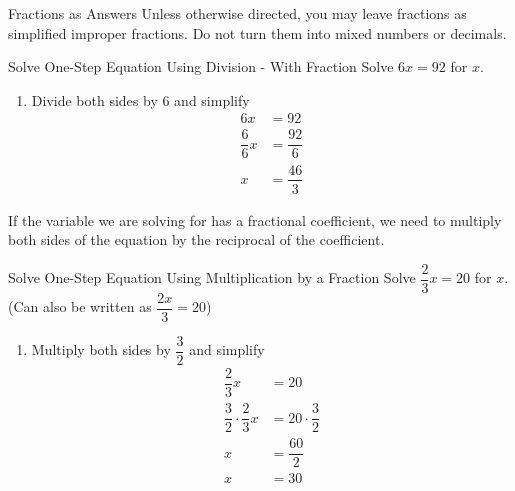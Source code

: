 \begin{note}{Fractions as Answers}{}
    Unless otherwise directed, you may leave fractions as simplified improper fractions. Do not turn them into mixed numbers or decimals.
\end{note}
\begin{example}{Solve One-Step Equation Using Division - With Fraction}{}
    Solve $6x=92$ for $x$.
    \begin{enumerate}
        \item[] Divide both sides by $6$ and simplify
        \begin{align*}        
            6x&=92\\
            \dfrac{6}{6}x&=\dfrac{92}{6}\\
            x&=\dfrac{46}{3}
        \end{align*}        
    \end{enumerate}
\end{example}
If the variable we are solving for has a fractional coefficient, we need to multiply both sides of the equation by the reciprocal of the coefficient.
\begin{example}{Solve One-Step Equation Using Multiplication by a Fraction}{}
    Solve $\dfrac{2}{3}x=20$ for $x$. (Can also be written as $\dfrac{2x}{3}=20$)
    \begin{enumerate}
        \item[] Multiply both sides by $\dfrac{3}{2}$ and simplify
        \begin{align*}        
            \dfrac{2}{3}x&=20\\
            \dfrac{3}{2}\cdot\dfrac{2}{3}x&=20\cdot\dfrac{3}{2}\\
            x&=\dfrac{60}{2}\\
            x&=30
        \end{align*}        
    \end{enumerate}    
\end{example}
